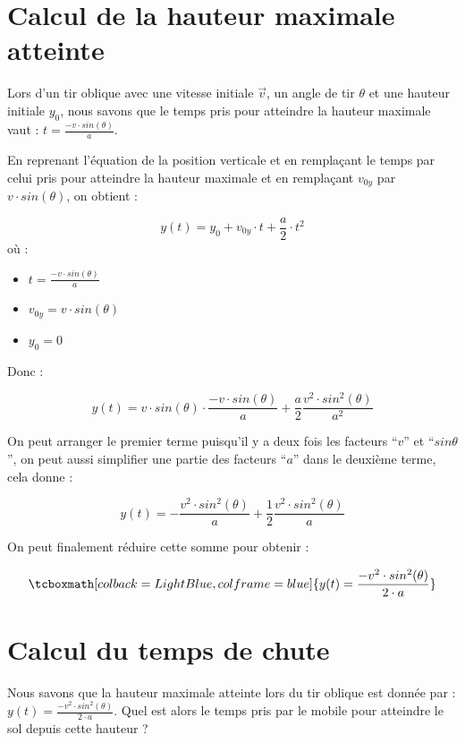 \newpage

\section{Calcul de la hauteur maximale atteinte}
Lors d'un tir oblique avec une vitesse initiale \(\vec{v}\), un angle de tir \(\theta\) et une hauteur initiale \(y_0\), nous savons que le temps pris pour atteindre la hauteur maximale vaut : \(t=\frac{-v \cdot sin(\theta)}{a}\).

En reprenant l'équation de la position verticale et en remplaçant le temps par celui pris pour atteindre la hauteur maximale et en remplaçant \(v_{0y}\) par \(v \cdot sin(\theta)\), on obtient :

\begin{equation}
    y(t)=y_0 + v_{0y} \cdot t + \frac{a}{2} \cdot t^2
\end{equation} où :

\begin{itemize}[label=\textbullet]
    \item \(t=\frac{-v \cdot sin(\theta)}{a}\)
    \item \(v_{0y}=v \cdot sin(\theta)\)
    \item \(y_0=0\)
\end{itemize}

Donc :

\begin{equation}
    y(t)=v \cdot sin(\theta) \cdot \frac{-v \cdot sin(\theta)}{a} + \frac{a}{2} \frac{v^2 \cdot sin^2(\theta)}{a^2}
\end{equation}

On peut arranger le premier terme puisqu'il y a deux fois les facteurs \enquote{\(v\)} et \enquote{\(sin \theta\)}, on peut aussi simplifier une partie des facteurs \enquote{\(a\)} dans le deuxième terme, cela donne :

\begin{equation}
    y(t)=- \frac{v^2 \cdot sin^2(\theta)}{a} + \frac{1}{2} \frac{v^2 \cdot sin^2(\theta)}{a}
\end{equation}

On peut finalement réduire cette somme pour obtenir :


\begin{equation}
    \tcboxmath[colback=LightBlue,colframe=blue]{y(t)=\frac{-v^2 \cdot sin^2(\theta)}{2 \cdot a}}
\end{equation}

\section{Calcul du temps de chute}
Nous savons que la hauteur maximale atteinte lors du tir oblique est donnée par : \(y(t)=\frac{-v^2 \cdot sin^2(\theta)}{2 \cdot a}\). Quel est alors le temps pris par le mobile pour atteindre le sol depuis cette hauteur ?

